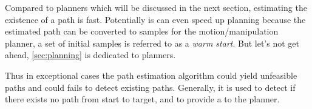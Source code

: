 Compared to planners which will be discussed in the next section, estimating the existence of a path is fast. Potentially is can even speed up planning because the estimated path can be converted to samples for the motion/manipulation planner, a set of initial samples is referred to as a \textit{warm start}. But let's not get ahead, \cref{sec:planning} is dedicated to planners.\bs

Thus in exceptional cases the path estimation algorithm could yield unfeasible paths and could fails to detect existing paths. Generally, it is used to detect if there exists no path from start to target, and to provide a  to the planner. \bs
